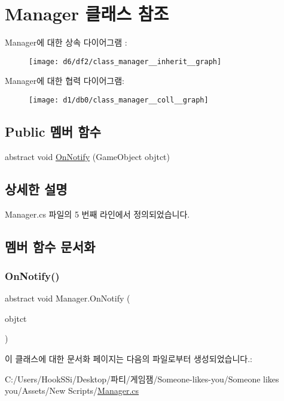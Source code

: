 \hypertarget{class_manager}{}\section{Manager 클래스 참조}
\label{class_manager}


Manager에 대한 상속 다이어그램 \+: \nopagebreak
\begin{figure}[H]
\begin{center}
\leavevmode
\texttt{[image: d6/df2/class\_manager\_\_inherit\_\_graph]}
\end{center}
\end{figure}


Manager에 대한 협력 다이어그램\+:\nopagebreak
\begin{figure}[H]
\begin{center}
\leavevmode
\texttt{[image: d1/db0/class\_manager\_\_coll\_\_graph]}
\end{center}
\end{figure}
\subsection*{Public 멤버 함수}
\begin{DoxyCompactItemize}
\item 
abstract void \mbox{\hyperlink{class_manager_af8f781331eb3451725d6b0a78131de19}{On\+Notify}} (Game\+Object objtct)
\end{DoxyCompactItemize}


\subsection{상세한 설명}


Manager.\+cs 파일의 5 번째 라인에서 정의되었습니다.



\subsection{멤버 함수 문서화}
\mbox{\label{class_manager_af8f781331eb3451725d6b0a78131de19}} 
\subsubsection{\texorpdfstring{OnNotify()}{OnNotify()}}
{\footnotesize\ttfamily abstract void Manager.\+On\+Notify (\begin{DoxyParamCaption}\item[{Game\+Object}]{objtct }\end{DoxyParamCaption})\hspace{0.3cm}{\ttfamily [pure virtual]}}



이 클래스에 대한 문서화 페이지는 다음의 파일로부터 생성되었습니다.\+:\begin{DoxyCompactItemize}
\item 
C\+:/\+Users/\+Hook\+S\+Si/\+Desktop/파티/게임잼/\+Someone-\/likes-\/you/\+Someone likes you/\+Assets/\+New Scripts/\mbox{\hyperlink{_manager_8cs}{Manager.\+cs}}\end{DoxyCompactItemize}
